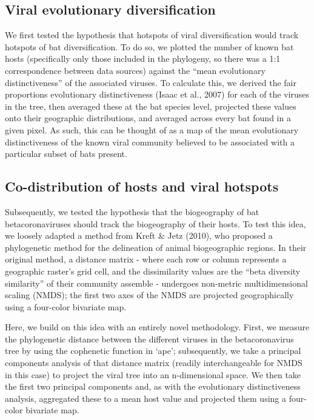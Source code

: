 \documentclass[11pt]{article}
\begin{document}
\hypertarget{viral-evolutionary-diversification}{%
\subsection{Viral evolutionary
diversification}\label{viral-evolutionary-diversification}}

We first tested the hypothesis that hotspots of viral diversification
would track hotspots of bat diversification. To do so, we plotted the
number of known bat hosts (specifically only those included in the
phylogeny, so there was a 1:1 correspondence between data sources)
against the ``mean evolutionary distinctiveness'' of the associated
viruses. To calculate this, we derived the fair proportions evolutionary
distinctiveness (Isaac et al., 2007) for each of the viruses in the
tree, then averaged these at the bat species level, projected these
values onto their geographic distributions, and averaged across every
bat found in a given pixel. As such, this can be thought of as a map of
the mean evolutionary distinctiveness of the known viral community
believed to be associated with a particular subset of bats present.

\hypertarget{co-distribution-of-hosts-and-viral-hotspots}{%
\subsection{Co-distribution of hosts and viral
hotspots}\label{co-distribution-of-hosts-and-viral-hotspots}}

Subsequently, we tested the hypothesis that the biogeography of bat
betacoronaviruses should track the biogeography of their hosts. To test
this idea, we loosely adapted a method from Kreft \& Jetz (2010), who
proposed a phylogenetic method for the delineation of animal
biogeographic regions. In their original method, a distance matrix -
where each row or column represents a geographic raster's grid cell, and
the dissimilarity values are the ``beta diversity similarity'' of their
community assemble - undergoes non-metric multidimensional scaling
(NMDS); the first two axes of the NMDS are projected geographically
using a four-color bivariate map.

Here, we build on this idea with an entirely novel methodology. First,
we measure the phylogenetic distance between the different viruses in
the betacoronavirus tree by using the cophenetic function in `ape';
subsequently, we take a principal components analysis of that distance
matrix (readily interchangeable for NMDS in this case) to project the
viral tree into an n-dimensional space. We then take the first two
principal components and, as with the evolutionary distinctiveness
analysis, aggregated these to a mean host value and projected them using
a four-color bivariate map.
\end{document}
